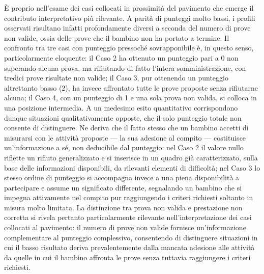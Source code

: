 È proprio nell'esame dei casi collocati in prossimità del pavimento che emerge il contributo interpretativo più rilevante. A parità di punteggi molto bassi, i profili osservati risultano infatti profondamente diversi a seconda del numero di prove non valide, ossia delle prove che il bambino non ha portato a termine. Il confronto tra tre casi con punteggio pressoché sovrapponibile è, in questo senso, particolarmente eloquente: il Caso 2 ha ottenuto un punteggio pari a 0 non superando alcuna prova, ma rifiutando di fatto l'intera somministrazione, con tredici prove risultate non valide; il Caso 3, pur ottenendo un punteggio altrettanto basso (2), ha invece affrontato tutte le prove proposte senza rifiutarne alcuna; il Caso 4, con un punteggio di 1 e una sola prova non valida, si colloca in una posizione intermedia. A un medesimo esito quantitativo corrispondono dunque situazioni qualitativamente opposte, che il solo punteggio totale non consente di distinguere. Ne deriva che il fatto stesso che un bambino accetti di misurarsi con le attività proposte --- la sua adesione al compito --- costituisce un'informazione a sé, non deducibile dal punteggio: nel Caso 2 il valore nullo riflette un rifiuto generalizzato e si inserisce in un quadro già caratterizzato, sulla base delle informazioni disponibili, da rilevanti elementi di difficoltà; nel Caso 3 lo stesso ordine di punteggio si accompagna invece a una piena disponibilità a partecipare e assume un significato differente, segnalando un bambino che si impegna attivamente nel compito pur raggiungendo i criteri richiesti soltanto in misura molto limitata. La distinzione tra prova non valida e prestazione non corretta si rivela pertanto particolarmente rilevante nell'interpretazione dei casi collocati al pavimento: il numero di prove non valide fornisce un'informazione complementare al punteggio complessivo, consentendo di distinguere situazioni in cui il basso risultato deriva prevalentemente dalla mancata adesione alle attività da quelle in cui il bambino affronta le prove senza tuttavia raggiungere i criteri richiesti.


